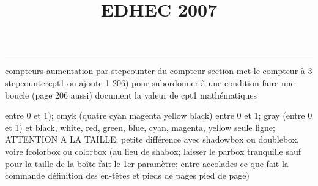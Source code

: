 \documentclass[11pt]{article}%
\title{\bf \vspace{-2cm} EDHEC 2007} %
\author{} %
\date{} %
\renewcommand{\headrulewidth}{0pt}%
\renewcommand{\footrulewidth}{0.4pt}%
\begin{document}
\maketitle %
\vspace{-1.4cm}\hrule %
\thispagestyle{fancy}

\vspace*{.2cm}



compteurs%
aumentation par stepcounter du compteur section%
met le compteur à 3%
stepcounter{cpt1} on ajoute 1%
206) pour subordonner à une condition %
faire une boucle (page 206 aussi) %
document la valeur de cpt1 
mathématiques\newcommand{\ch}{\operatorname{ch}} 
\newcommand{\sh}{\operatorname{sh}}
\renewcommand{\tanh}{\operatorname{th}}
\renewcommand{\sinh}{\operatorname{sh}}
\renewcommand{\cosh}{\operatorname{ch}}
\newcommand{\argsh}{\operatorname{argsh}}
\newcommand{\argch}{\operatorname{argch}}
\newcommand{\argth}{\operatorname{argth}}
\newcommand{\ker}{\operatorname{Ker}}
\renewcommand{\im}{\operatorname{Im}}
\newcommand{\rg}{\operatorname{rg}}
\newcommand{\Id}{\operatorname{Id}}
\newcommand{\id}{\operatorname{id}}
\renewcommand{\leq}{\leq}
\renewcommand{\geq}{\geq }

entre 0 et 1); cmyk (quatre cyan magenta yellow black) entre 0 et 1;
gray (entre 0 et 1) et black, white, red, green, blue, cyan, magenta,
yellow%
seule ligne; ATTENTION A LA TAILLE; petite différence avec shadowbox ou
doublebox, voire fcolorbox ou colorbox (au lieu de shabox; laisser le
parbox tranquille sauf pour la taille de la boîte
\newcommand{\Tbox}[1]{\begin{center} \shabox{\parbox{0.6
\linewidth}{#1}} \end{center}} %
fait le 1er paramètre; entre accolades ce que fait la commande
définition des en-têtes et pieds de pages\pagestyle{fancy}
\chead{}
\rfoot[ \ \thepage]{\thepage}
\cfoot{}
\lfoot{}
\thispagestyle{fancy} %
pied de page)\renewcommand{\footrulewidth}{0.4pt}
\renewcommand{\headrulewidth}{0.4pt}
\end{document}
